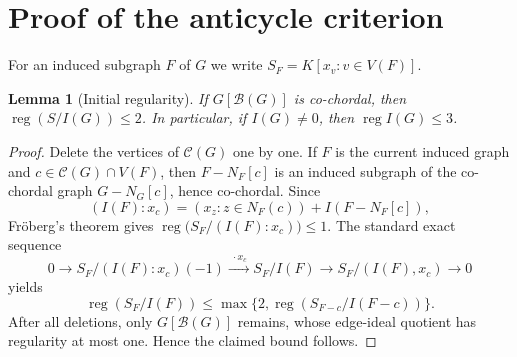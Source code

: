 \documentclass[11pt,a4paper]{article}
\newtheorem{lemma}[theorem]{Lemma}
\theoremstyle{remark}\newtheorem{remark}[theorem]{Remark}
\newcommand{\reg}{\operatorname{reg}}
\newcommand{\Bad}{\mathcal B}
\newcommand{\Good}{\mathcal C}
\begin{document}
\section{Proof of the anticycle criterion}\label{sec:proof}
For an induced subgraph $F$ of $G$ we write $S_F=K[x_v:v\in V(F)]$.

\begin{lemma}[Initial regularity]\label{lem:initial}
If $G[\Bad(G)]$ is co-chordal, then $\reg(S/I(G))\le2$. In particular, if $I(G)\ne0$, then $\reg I(G)\le3$.
\end{lemma}
\begin{proof}
Delete the vertices of $\Good(G)$ one by one. If $F$ is the current induced graph and $c\in\Good(G)\cap V(F)$, then $F-N_F[c]$ is an induced subgraph of the co-chordal graph $G-N_G[c]$, hence co-chordal. Since
\[
 (I(F):x_c)=(x_z:z\in N_F(c))+I(F-N_F[c]),
\]
Fr\"oberg's theorem \cite{Froberg} gives $\reg\big(S_F/(I(F):x_c)\big)\le1$. The standard exact sequence
\[
 0\to S_F/(I(F):x_c)(-1)\xrightarrow{\;\cdot x_c\;}S_F/I(F)\to S_F/(I(F),x_c)\to0
\]
yields
\[
 \reg(S_F/I(F))\le\max\{2,\reg(S_{F-c}/I(F-c))\}.
\]
After all deletions, only $G[\Bad(G)]$ remains, whose edge-ideal quotient has regularity at most one. Hence the claimed bound follows.
\end{proof}
\end{document}
